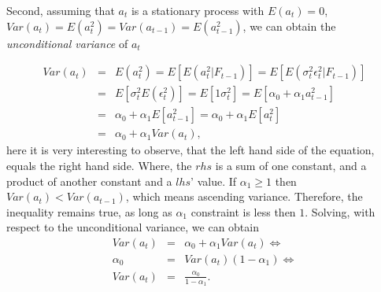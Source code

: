 \documentclass[a4paper,11pt,english]{article}
\begin{document}
			Second, assuming that $a_t$ is a stationary process with $E(a_t) = 0$, $Var(a_t) = E(a^2_t) = Var(a_{t-1}) = E(a^2_{t-1})$, we can obtain
			the \emph{unconditional variance} of $a_t$
	
			\begin{eqnarray*}
	         Var(a_t) &=& E(a^2_t) = E\left[ E(a^2_t | F_{t-1}) \right] = E\left[ E(\sigma_t^2 \epsilon_t^2 | F_{t-1}) \right]   \\
			          &=& E\left[\sigma_t^2 E(\epsilon_t^2) \right] = E\left[1 \sigma_t^2 \right] = E\left[\alpha_0 + \alpha_1 a^2_{t-1} \right] \\
			    	  &=&	\alpha_0 + \alpha_1 E\left[a^2_{t-1} \right] = \alpha_0 + \alpha_1 E\left[a^2_t \right] \\
			    	  &=& \alpha_0 + \alpha_1 Var(a_t),
			\end{eqnarray*}
			here it is very interesting to observe, that the left hand side of the equation, equals the right hand side. Where, the $rhs$ is a sum of one 
			constant, and a product of another constant and a $lhs$' value. If $\alpha_1  \geq 1$ then $ Var(a_t) < Var(a_{t-1})$, which means ascending 
			variance. Therefore, the inequality remains true, as long as $\alpha_1$ constraint is less then $1$. Solving, with respect to the unconditional 
			variance, we can obtain 
			\begin{eqnarray*}
				Var(a_t) &=& \alpha_0 + \alpha_1 Var(a_t) \Leftrightarrow  \\ 
				\alpha_0 &=& Var(a_t)(1-\alpha_1)  \Leftrightarrow\\
				Var(a_t)&=& \frac{\alpha_0}{1 - \alpha_1}.  
			\end{eqnarray*} 
			
\end{document}
